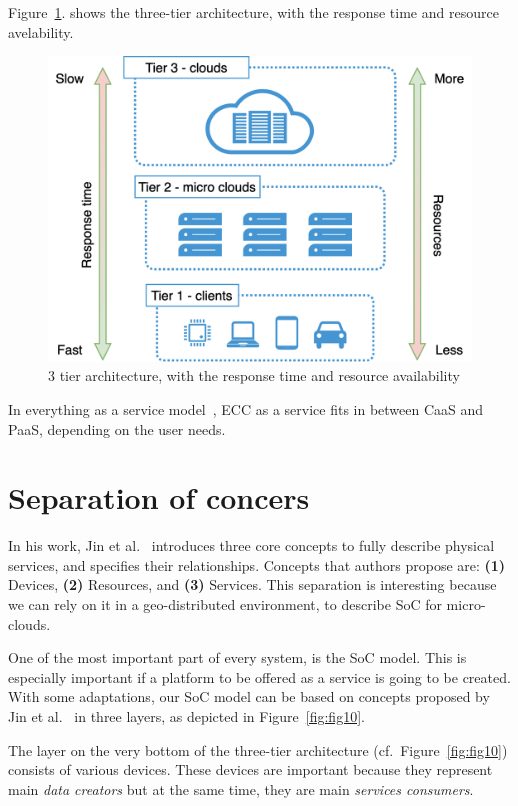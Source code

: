 Figure~\ref{fig:fig9}. shows the three-tier architecture, with the response time and resource avelability.

\begin{figure}[H]
	\includegraphics[width=\linewidth]{images/Figure9}
	\vspace{-0.7cm}
	\caption{3 tier architecture, with the response time and resource availability}
	\label{fig:fig9}
\end{figure}

\noindent
In everything as a service model~\cite{DuanFZSNH15}, ECC as a service fits in between CaaS and PaaS, depending on the user needs. 
%
%
\section{Separation of concers}\label{sec:separation_of_concerns}
%
In his work, Jin et al.~\cite{JinCJL14} introduces three core concepts to fully describe physical services, and specifies their relationships. Concepts that authors propose are: \textbf{(1)} Devices, \textbf{(2)} Resources, and \textbf{(3)} Services. This separation is interesting because we can rely on it in a geo-distributed environment, to describe SoC for micro-clouds.

One of the most important part of every system, is the SoC model. This is especially important if a platform to be offered as a service is going to be created. With some adaptations, our SoC model can be based on concepts proposed by Jin et al.~\cite{JinCJL14} in three layers, as depicted in Figure~\ref{fig:fig10}. 

The layer on the very bottom of the three-tier architecture (cf.~Figure~\ref{fig:fig10}) consists of various devices. These devices are important because they represent main \textit{data creators} but at the same time, they are main \textit{services consumers}. 

